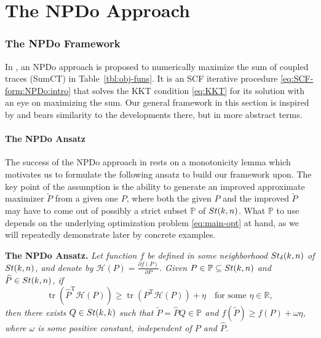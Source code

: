 \documentclass[11pt]{article}
\def\bbP{\mathbb{P}}
\def\bbR{\mathbb{R}}
\def\scrH{\mathscr{H}}
\def\wtd{\widetilde}
\def\what{\widehat}
\newcommand\STM[2]{{\rm St}(#1,#2)}
\newcommand\STMnbr{{\rm St}_{\delta}(k,n)}
\DeclareMathOperator{\tr}{tr}
\DeclareMathOperator{\T}{T}
\theoremstyle{definition}
\numberwithin{equation}{section}
\begin{document}
\clearpage
\part{The NPDo Approach}

\section{The NPDo Framework}\label{sec:NPDo-theory}
In \cite{wazl:2022a}, an NPDo approach is proposed to
numerically maximize the sum of coupled traces (SumCT) in Table~\ref{tbl:obj-funs}. It is an SCF iterative procedure \eqref{eq:SCF-form:NPDo:intro}
that solves  the KKT condition \eqref{eq:KKT} for its solution with an eye on maximizing the sum.
Our general framework in this section is inspired by and bears similarity to the developments there, but in more abstract terms.


\subsection{The NPDo Ansatz}\label{ssec:NPDAssum}
The success of the NPDo approach in \cite{wazl:2022a} rests on  a monotonicity lemma
which motivates us to formulate the following ansatz to build our framework upon.
The key point of the assumption is the ability to generate an improved approximate maximizer $\wtd P$
from a given one $P$, where both the given $P$ and the improved $\wtd P$ may have to come out of possibly a
        strict subset $\bbP$ of $\STM{k}{n}$.
What $\bbP$ to use
depends on the underlying optimization problem \eqref{eq:main-opt} at hand,
as we will repeatedly demonstrate later by concrete examples.

\smallskip\noindent
{\bf The NPDo Ansatz.}
{\em
Let function $f$ be defined in some neighborhood $\STMnbr$ of $\STM{k}{n}$,
and denote by $\scrH(P)=\frac{\partial f(P)}{\partial P}$.
Given $P\in\bbP\subseteq\STM{k}{n}$ and $\what P\in\STM{k}{n}$,
if
\begin{equation}\label{eq:NPDo-assume}
\tr(\what P^{\T}\scrH(P))\ge\tr(P^{\T}\scrH(P))+\eta
\quad\mbox{for some $\eta\in\bbR$},
\end{equation}
then
there exists $Q\in\STM{k}{k}$ such that $\wtd P=\what PQ\in\bbP$ and
$f(\wtd P)\ge f(P)+\omega\eta$,
where $\omega$ is some positive constant, independent of $P$ and $\what P$.
}
\end{document}
